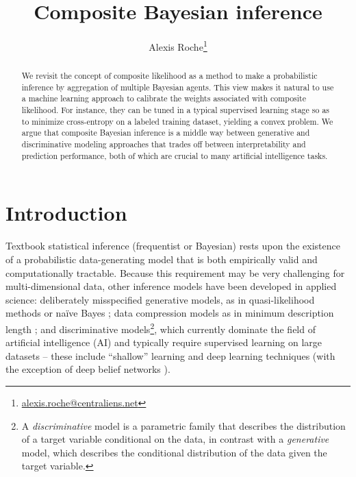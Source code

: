 \documentclass[english]{scrartcl}
\title{Composite Bayesian inference}
\date{}
\author{Alexis Roche\thanks{\url{alexis.roche@centraliens.net}}}
\begin{document}
\maketitle

\begin{abstract}
We revisit the concept of composite likelihood as a method to make a probabilistic inference by aggregation of multiple Bayesian agents. This view makes it natural to use a machine learning approach to calibrate the weights associated with composite likelihood. For instance, they can be tuned in a typical supervised learning stage so as to minimize cross-entropy on a labeled training dataset, yielding a convex problem. We argue that composite Bayesian inference is a middle way between generative and discriminative modeling approaches that trades off between interpretability and prediction performance, both of which are crucial to many artificial intelligence tasks.
\end{abstract}



\section{Introduction}
\label{sec:intro}

Textbook statistical inference (frequentist or Bayesian) rests upon the existence of a probabilistic data-generating model that is both empirically valid and computationally tractable. Because this requirement may be very challenging for multi-dimensional data, other inference models have been developed in applied science: deliberately misspecified generative models, as in quasi-likelihood methods \cite{White-82,Walker-13} or na\"ive Bayes \cite{Ng-01}; data compression models as in minimum description length \cite{Grunwald-07}; and discriminative models\footnote{A {\em discriminative} model is a parametric family that describes the distribution of a target variable conditional on the data, in contrast with a {\em generative} model, which describes the conditional distribution of the data given the target variable.}, which currently dominate the field of artificial intelligence (AI) and typically require supervised learning on large datasets -- these include ``shallow'' learning \cite{Ho-95,BergerA-96,Vapnik-00,Rasmussen-06} and deep learning \cite{Lecun-15,Goodfellow-16} techniques (with the exception of deep belief networks \cite{Hinton-06}).
\end{document}

